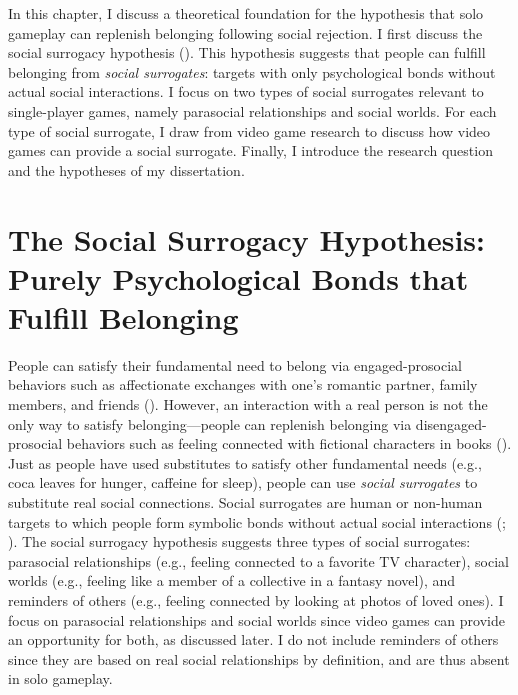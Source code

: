 \documentclass[
]{udthesis}
\begin{document}
In this chapter, I discuss a theoretical foundation for the hypothesis
that solo gameplay can replenish belonging following social rejection. I
first discuss the social surrogacy hypothesis (). This
hypothesis suggests that people can fulfill belonging from \emph{social
surrogates}: targets with only psychological bonds without actual social
interactions. I focus on two types of social surrogates relevant to
single-player games, namely parasocial relationships and social worlds.
For each type of social surrogate, I draw from video game research to
discuss how video games can provide a social surrogate. Finally, I
introduce the research question and the hypotheses of my dissertation.

\section{The Social Surrogacy Hypothesis: Purely Psychological Bonds that Fulfill Belonging}\label{the-social-surrogacy-hypothesis-purely-psychological-bonds-that-fulfill-belonging}

People can satisfy their fundamental need to belong via
engaged-prosocial behaviors such as affectionate exchanges with one's
romantic partner, family members, and friends ().
However, an interaction with a real person is not the only way to
satisfy belonging---people can replenish belonging via
disengaged-prosocial behaviors such as feeling connected with fictional
characters in books (). Just as people have used substitutes
to satisfy other fundamental needs (e.g., coca leaves for hunger,
caffeine for sleep), people can use \emph{social surrogates} to substitute
real social connections. Social surrogates are human or non-human
targets to which people form symbolic bonds without actual social
interactions (; ). The social surrogacy
hypothesis suggests three types of social surrogates: parasocial
relationships (e.g., feeling connected to a favorite TV character),
social worlds (e.g., feeling like a member of a collective in a fantasy
novel), and reminders of others (e.g., feeling connected by looking at
photos of loved ones). I focus on parasocial relationships and social
worlds since video games can provide an opportunity for both, as
discussed later. I do not include reminders of others since they are
based on real social relationships by definition, and are thus absent in
solo gameplay.
\end{document}
